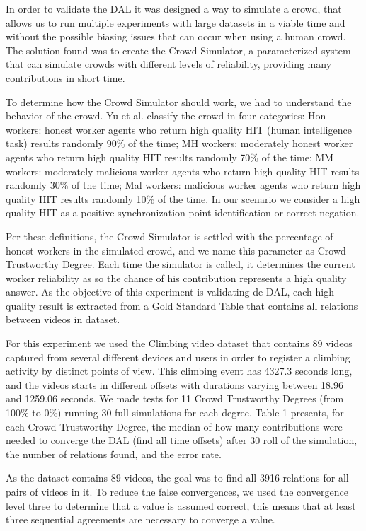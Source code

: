 
In order to validate the DAL it was designed a way to simulate a crowd, that allows us to run multiple experiments with large datasets in a viable time and without the possible biasing issues that can occur when using a human crowd. The solution found was to create the Crowd Simulator, a parameterized system that can simulate crowds with different levels of reliability, providing many contributions in short time.

To determine how the Crowd Simulator should work, we had to understand the behavior of the crowd. Yu et al.\cite{yu2012challenges} classify the crowd in four categories: Hon workers: honest worker agents who return high quality HIT (human intelligence task) results randomly 90\% of the time; MH workers: moderately honest worker agents who return high quality HIT results randomly 70\% of the time; MM workers: moderately malicious worker agents who return high quality HIT results randomly 30\% of the time; Mal workers: malicious worker agents who return high quality HIT results randomly 10\% of the time. In our scenario we consider a high quality HIT as a positive synchronization point identification or correct negation.

Per these definitions, the Crowd Simulator is settled with the percentage of honest workers in the simulated crowd, and we name this parameter as Crowd Trustworthy Degree. Each time the simulator is called, it determines the current worker reliability as so the chance of his contribution represents a high quality answer. As the objective of this experiment is validating de DAL, each high quality result is extracted from a Gold Standard Table that contains all relations between videos in dataset.

For this experiment we used the Climbing video dataset \cite{hal-01162603} that contains 89 videos captured from several different devices and users in order to register a climbing activity by distinct points of view. This climbing event has 4327.3 seconds long, and the videos starts in different offsets with durations varying between 18.96 and 1259.06 seconds. We made tests for 11 Crowd Trustworthy Degrees (from 100\% to 0\%) running 30 full simulations for each degree. Table 1 presents, for each Crowd Trustworthy Degree, the median of how many contributions were needed to converge the DAL (find all time offsets) after 30 roll of the simulation, the number of relations found, and the error rate.

As the dataset contains 89 videos, the goal was to find all 3916 relations for all pairs of videos in it. To reduce the false convergences, we used the convergence level three to determine that a value is assumed correct, this means that at least three sequential agreements are necessary to converge a value.

